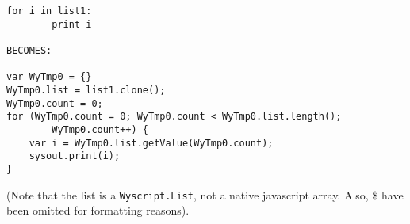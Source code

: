 \begin{lstlisting}
for i in list1:
        print i

BECOMES:

var WyTmp0 = {}
WyTmp0.list = list1.clone();
WyTmp0.count = 0;
for (WyTmp0.count = 0; WyTmp0.count < WyTmp0.list.length();
        WyTmp0.count++) {
    var i = WyTmp0.list.getValue(WyTmp0.count);
    sysout.print(i);
}
\end{lstlisting}
(Note that the list is a \lstinline{Wyscript.List}, not a native javascript array. Also, \$ have been omitted for formatting reasons).
